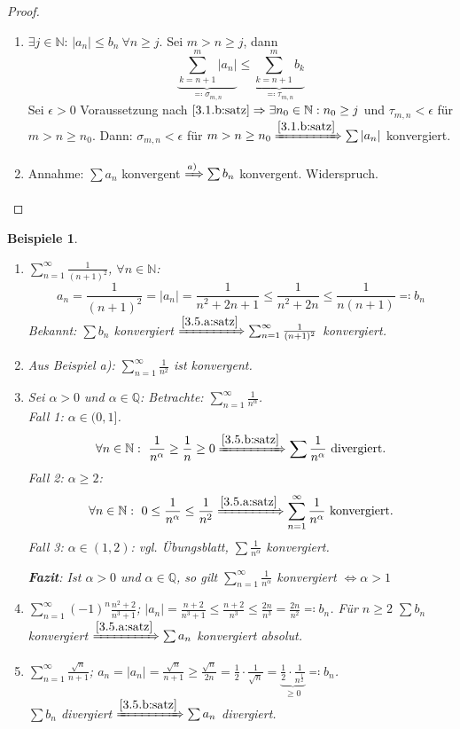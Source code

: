 \documentclass[titlepage,ngerman,a4paper,headsepline]{scrartcl}
\newcommand{\N}{\mathbb{N}}
\newcommand{\Q}{\mathbb{Q}}
\theoremstyle{named}
\theoremstyle{dotless}
\newtheorem*{beispiele}{Beispiele}
\begin{document}
\begin{proof} ~\
	\begin{enumerate}
		\item $\exists j \in \N$: $|a_{n}| \leq b_{n} ~\forall n \geq j$. Sei $m > n \geq j$, dann
			$$ \underbrace{\sum_{k=n+1}^{m}|a_{n}|}_{\eqqcolon \sigma_{m, n}} \leq \underbrace{\sum_{k=n+1}^{m} b_{k}}_{\eqqcolon \tau_{m,n}} $$
			Sei $\epsilon > 0$ Voraussetzung nach $\ref{3.1.b:satz} \Rightarrow \exists n_{0} \in \N: n_{0} \geq j$ und $\tau_{m,n} < \epsilon$ für $m > n \geq n_{0}$. Dann: $\sigma_{m,n} < \epsilon$ für $m > n \geq n_{0} \xRightarrow[]{\ref{3.1.b:satz}} \sum |a_{n}|$ konvergiert.
		\item Annahme: $\sum a_{n}$ konvergent $\xRightarrow[]{a)} \sum b_{n}$ konvergent. Widerspruch.
	\end{enumerate}	
\end{proof}


\begin{beispiele} ~\
	\begin{enumerate}
		\item $\sum_{n=1}^{\infty} \frac{1}{(n+1)^{2}}$, $\forall n \in \N$:
			$$ a_{n} = \frac{1}{(n+1)^{2}} = |a_{n}| = \frac{1}{n^{2} + 2n +1} \leq \frac{1}{n^{2} + 2n} \leq \frac{1}{n(n+1)} \eqqcolon b_{n} $$
			Bekannt: $\sum b_{n}$ konvergiert $\xRightarrow[]{\ref{3.5.a:satz}} \sum_{n=1}^{\infty} \frac{1}{(n+1)^{2}}$ konvergiert.
		\item Aus Beispiel a): $\sum_{n=1}^{\infty} \frac{1}{n^{2}}$ ist konvergent.
		\item Sei $\alpha > 0$ und $\alpha \in \Q$: Betrachte: $\sum_{n=1}^{\infty} \frac{1}{n^{\alpha}}$. \\
			Fall 1: $\alpha \in (0, 1]$.
				$$ \forall n \in \N: ~ \frac{1}{n^{\alpha}} \geq \frac{1}{n} \geq 0 \xRightarrow[]{\ref{3.5.b:satz}} \sum \frac{1}{n^{\alpha}} \text{ divergiert.} $$
			Fall 2: $\alpha \geq 2$:
				$$ \forall n \in \N: ~ 0 \leq \frac{1}{n^{\alpha}} \leq \frac{1}{n^{2}} \xRightarrow[]{\ref{3.5.a:satz}} \sum_{n=1}^{\infty} \frac{1}{n^{\alpha}} \text{ konvergiert.} $$
			Fall 3: $\alpha \in (1, 2)$: vgl. Übungsblatt, $\sum \frac{1}{n^{\alpha}}$ konvergiert. 
			
			\textbf{Fazit}: Ist $\alpha > 0$ und $\alpha \in \Q$, so gilt $\sum_{n=1}^{\infty} \frac{1}{n^{\alpha}}$ konvergiert $\Leftrightarrow \alpha > 1$
		\item $\sum_{n=1}^{\infty} (-1)^{n} \frac{n^{2} + 2}{n^{3} + 1}$; $|a_{n}| = \frac{n+2}{n^{3} + 1} \leq \frac{n+2}{n^{3}} \leq \frac{2n}{n^{3}} = \frac{2n}{n^{2}} \eqqcolon b_{n}$. Für $n \geq 2$ $\sum b_{n}$ konvergiert $\xRightarrow[]{\ref{3.5.a:satz}} \sum a_{n}$ konvergiert absolut.
		\item $\sum_{n=1}^{\infty} \frac{\sqrt{n}}{n+1}$; $a_{n} = |a_{n}| = \frac{\sqrt{n}}{n+1} \geq \frac{\sqrt{n}}{2n} = \frac{1}{2} \cdot \frac{1}{\sqrt{n}} = \underbrace{\frac{1}{2} \cdot \frac{1}{n^{\frac{1}{2}}}}_{\geq 0} \eqqcolon b_{n}$. \\
			$\sum b_{n}$ divergiert $\xRightarrow[]{\ref{3.5.b:satz}} \sum a_{n}$ divergiert.
	\end{enumerate}		
\end{beispiele}
\end{document}
